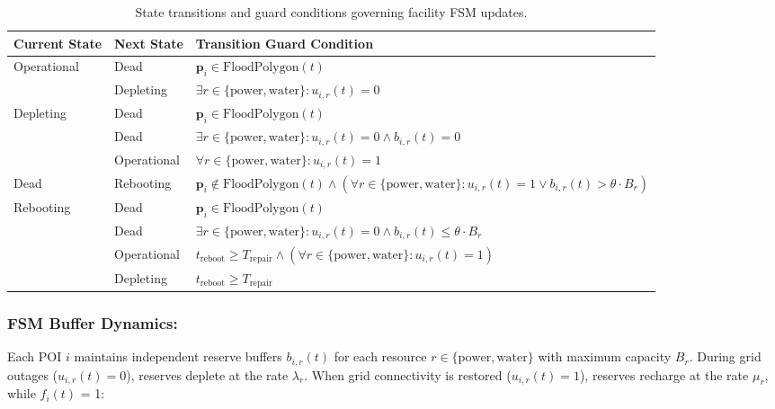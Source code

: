 \begin{table}[htbp]
    \centering
    \caption{State transitions and guard conditions governing facility FSM updates.}
    \label{tab:fsm-state-transitions}
    \renewcommand{\arraystretch}{1.30} %
    \begin{tabularx}{\textwidth}{l l X}
        \hline
        \textbf{Current State} & \textbf{Next State} & \textbf{Transition Guard Condition} \\
        \hline
        Operational & Dead        & $\mathbf{p}_i \in \text{FloodPolygon}(t)$ \\
        & Depleting   & $\exists r \in \{\text{power}, \text{water}\} : u_{i,r}(t) = 0$ \\
        \hline
        Depleting   & Dead        & $\mathbf{p}_i \in \text{FloodPolygon}(t)$ \\
        & Dead        & $\exists r \in \{\text{power}, \text{water}\} : u_{i,r}(t) = 0 \land b_{i,r}(t) = 0$ \\
        & Operational & $\forall r \in \{\text{power}, \text{water}\} : u_{i,r}(t) = 1$ \\
        \hline
        Dead        & Rebooting   & $\mathbf{p}_i \notin \text{FloodPolygon}(t) \land (\forall r \in \{\text{power}, \text{water}\} : u_{i,r}(t) = 1 \lor b_{i,r}(t) > \theta \cdot B_r)$ \\
        \hline
        Rebooting   & Dead        & $\mathbf{p}_i \in \text{FloodPolygon}(t)$ \\
        & Dead        & $\exists r \in \{\text{power}, \text{water}\} : u_{i,r}(t) = 0 \land b_{i,r}(t) \le \theta \cdot B_r$ \\
        & Operational & $t_{\text{reboot}} \ge T_{\text{repair}} \land (\forall r \in \{\text{power}, \text{water}\} : u_{i,r}(t) = 1)$ \\
        & Depleting   & $t_{\text{reboot}} \ge T_{\text{repair}}$ \\
        \hline
    \end{tabularx}
\end{table}

\subsubsection{FSM Buffer Dynamics:}
\label{subsubsec:fsm-buffer-dynamics}
Each POI $i$ maintains independent reserve buffers $b_{i,r}(t)$ for each resource $r \in \{\text{power}, \text{water}\}$ with maximum capacity $B_r$.
During grid outages ($u_{i,r}(t) = 0$), reserves deplete at the rate $\lambda_r$.
When grid connectivity is restored ($u_{i,r}(t) = 1$), reserves recharge at the rate $\mu_r$, while $f_i(t)$ = 1:

